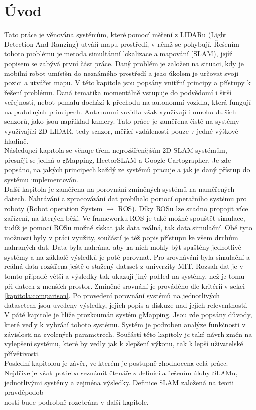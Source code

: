 \documentclass[12pt]{report}
\begin{document}
\chapter{Úvod}
Tato práce je věnována systémům, které pomocí měření z LIDARu (Light Detection And Ranging) utváří mapu prostředí, v němž se pohybují. Řešením tohoto problému je metoda simultánní lokalizace a mapování (SLAM), jejíž popisem se zabývá první část práce. Daný problém je založen na situaci, kdy je mobilní robot umístěn do neznámého prostředí a jeho úkolem je určovat svoji pozici a utvářet mapu. V této kapitole jsou popsány vnitřní principy a přístupy k řešení problému. Daná tematika momentálně vstupuje do podvědomí i širší veřejnosti, neboť pomalu dochází k přechodu na autonomní vozidla, která fungují na podobných principech. Autonomní vozidla však využívají i mnoho dalších senzorů, jako jsou například kamery. Tato práce je zaměřena čistě na systémy využívající 2D LIDAR, tedy senzor, měřící vzdálenosti pouze v jedné výškové hladině.\\
\indent Následující kapitola se věnuje třem nejrozšířenějším 2D SLAM systémům, přesněji se jedná o gMapping, HectorSLAM a Google Cartographer. Je zde popsáno, na jakých principech každý ze systémů pracuje a jak je daný přístup do systému implementován. \\
\indent Další kapitola je zaměřena na porovnání zmíněných systémů na naměřených datech. Nahrávání a zpracovávání dat probíhalo pomocí operačního systému pro roboty (Robot operation System $\rightarrow$ ROS). Díky ROSu lze snadno propojit více zařízení, na kterých běží. Ve frameworku ROS je také možné spouštět simulace, tudíž je pomocí ROSu možné získat jak data reálná, tak data simulační. Obě tyto možnosti byly v práci využity, součástí je též popis přístupu ke všem druhům nahraných dat. Data byla nahrána, aby na nich mohly být spuštěny jednotlivé systémy a na základě výsledků je poté porovnat. Pro srovnávání byla simulační a reálná data rozšířena ještě o stažený dataset z univerzity MIT. Rozsah dat je v tomto případě větší a výsledky tak ukazují jiný pohled na systémy, než je tomu při datech z menších prostor. Zmíněné srovnání je prováděno dle kritérií v sekci \ref{kapitola:comparison}. Po provedení porovnání systémů na jednotlivých datasetech jsou uvedeny výsledky, jejich popis a diskuze nad jejich relevantností. \\
\indent V páté kapitole je blíže prozkoumán systém gMapping. Jsou zde popsány důvody, které vedly k vybrání tohoto systému. Systém je podroben analýze funkčnosti v závislosti na zvolených parametrech. Součástí této kapitoly je také návrh změn na vylepšení systému, které by vedly jak k zlepšení výkonu, tak k lepší uživatelské přívětivosti. \\
\indent Poslední kapitolou je závěr, ve kterém je postupně zhodnocena celá práce. Nejdříve je však potřeba seznámit čtenáře s definicí a řešením úlohy SLAMu, jednotlivými systémy a zejména výsledky. Definice SLAM založená na teorii pravděpodob-\\nosti bude podrobně rozebrána v další kapitole.
\newpage
\end{document}

